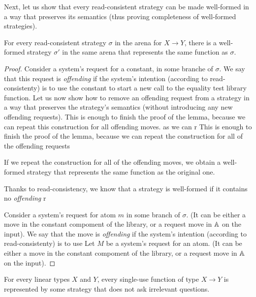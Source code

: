 Next, let us show that every read-consistent strategy can be made well-formed in a way that preserves its semantics
(thus proving completeness of well-formed strategies). 
\begin{lemma}
    For every read-consistent strategy $\sigma$ in the arena for $X \to Y$,
    there is a well-formed strategy $\sigma'$ in the same arena that represents the same function as $\sigma$.
\end{lemma}
\begin{proof}
    Consider a system's request for a constant, in some branche of $\sigma$. 
    We say that this request is \emph{offending} if the system's intention (according to read-consistenty) is to use
    the constant to start a new call to the equality test library function.
    Let us now show how to remove an offending request from a strategy in a way that preserves the strategy's semantics
    (without introducing any new offending requests). This is enough to finish the proof of the lemma,
    because we can repeat this construction for all offending moves. 
    as we can r
    This is enough to finish the proof of the lemma, 
    because we can repeat the construction for all of the offending requests

    If we repeat the construction for all of the offending moves, we obtain a well-formed strategy that represents the same function as the original one.

    Thanks to read-consistency, we know that 
    a strategy is well-formed if it contains no \emph{offending} r

    Consider a system's request for atom $m$ in some branch of $\sigma$. (It can be either a move in the constant compoment of the library, or a request move in $\mathbb A$ on the input).
    We say that the move is \emph{offending} if the system's intention (according to read-consistenty) is to use 
    Let $M$ be a system's request for an atom. (It can be either a move in the constant compoment of the library, or a request move in $\mathbb A$ on the input).
    


\end{proof}



\begin{lemma}\label{lem:eliminate-irrelevant-questions}
    For every linear types $X$ and $Y$, every single-use function of type  $X \to Y$ is represented by  some strategy that does not ask irrelevant questions.
\end{lemma}


